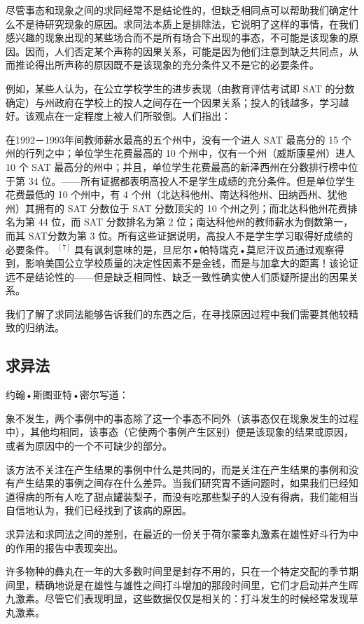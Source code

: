 尽管事态和现象之间的求同经常不是结论性的，但缺乏相同点可以帮助我们确定什么不是待研究现象的原因。求同法本质上是排除法，它说明了这样的事情，在我们感兴趣的现象出现的某些场合而不是所有场合下出现的事态，不可能是该现象的原因。因而，人们否定某个声称的因果关系，可能是因为他们注意到缺乏共同点，从而推论得出所声称的原因既不是该现象的充分条件又不是它的必要条件。

例如，某些人认为，在公立学校学生的进步表现（由教育评估考试即 SAT 的分数确定）与州政府在学校上的投人之间存在一个因果关系；投人的钱越多，学习越好。该观点在一定程度上被人们所驳倒。人们指出：

在1992－1993年间教师薪水最高的五个州中，没有一个进人 SAT 最高分的 15 个州的行列之中；单位学生花费最高的 10 个州中，仅有一个州（威斯康星州）进人 10 个 SAT 最高分的州中；并且，单位学生花费最高的新泽西州在分数排行榜中位于第 34 位。——所有证据都表明高投人不是学生成绩的充分条件。但是单位学生花费最低的 10 个州中，有 4 个州（北达科他州、南达科他州、田纳西州、犹他州）其拥有的 SAT 分数位于 SAT 分数顶尖的 10 个州之列；而北达科他州花费排名为第 44 位，而 SAT 分数排名为第 2 位；南达科他州的教师薪水为倒数第一，而其 SAT分数为第 3 位。所有这些证据说明，高投人不是学生学习取得好成绩的必要条件。 ${ }^{[7]}$ 具有讽刺意味的是，旦尼尔•帕特瑞克•莫尼汗议员通过观察得到，影响美国公立学校质量的决定性因素不是金钱，而是与加拿大的距离！该论证远不是结论性的——但是缺乏相同性、缺乏一致性确实使人们质疑所提出的因果关系。

我们了解了求同法能够告诉我们的东西之后，在寻找原因过程中我们需要其他较精致的归纳法。

\subsection{求异法}
约翰•斯图亚特•密尔写道：

象不发生，两个事例中的事态除了这一个事态不同外（该事态仅在现象发生的过程中），其他均相同，该事态（它使两个事例产生区别）便是该现象的结果或原因，或者为原因中的一个不可缺少的部分。

该方法不关注在产生结果的事例中什么是共同的，而是关注在产生结果的事例和没有产生结果的事例之间存在什么差异。当我们研究胃不适问题时，如果我们已经知道得病的所有人吃了甜点罐装梨子，而没有吃那些梨子的人没有得病，我们能相当自信地认为，我们已经找到了该病的原因。

求异法和求同法之间的差别，在最近的一份关于荷尔蒙睾丸激素在雄性好斗行为中的作用的报告中表现突出。

许多物种的彝丸在一年的大多数时间里是封存不用的，只在一个特定交配的季节期间里，精确地说是在雄性与雄性之间打斗增加的那段时间里，它们才启动并产生晖九激素。尽管它们表现明显，这些数据仅仅是相关的：打斗发生的时候经常发现草丸激素。

